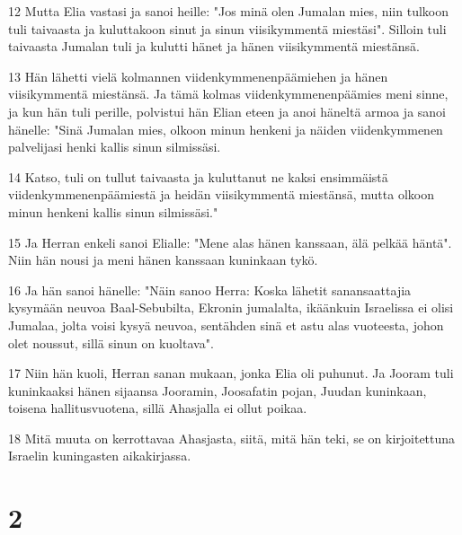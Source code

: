 \par 12 Mutta Elia vastasi ja sanoi heille: "Jos minä olen Jumalan mies, niin tulkoon tuli taivaasta ja kuluttakoon sinut ja sinun viisikymmentä miestäsi". Silloin tuli taivaasta Jumalan tuli ja kulutti hänet ja hänen viisikymmentä miestänsä.
\par 13 Hän lähetti vielä kolmannen viidenkymmenenpäämiehen ja hänen viisikymmentä miestänsä. Ja tämä kolmas viidenkymmenenpäämies meni sinne, ja kun hän tuli perille, polvistui hän Elian eteen ja anoi häneltä armoa ja sanoi hänelle: "Sinä Jumalan mies, olkoon minun henkeni ja näiden viidenkymmenen palvelijasi henki kallis sinun silmissäsi.
\par 14 Katso, tuli on tullut taivaasta ja kuluttanut ne kaksi ensimmäistä viidenkymmenenpäämiestä ja heidän viisikymmentä miestänsä, mutta olkoon minun henkeni kallis sinun silmissäsi."
\par 15 Ja Herran enkeli sanoi Elialle: "Mene alas hänen kanssaan, älä pelkää häntä". Niin hän nousi ja meni hänen kanssaan kuninkaan tykö.
\par 16 Ja hän sanoi hänelle: "Näin sanoo Herra: Koska lähetit sanansaattajia kysymään neuvoa Baal-Sebubilta, Ekronin jumalalta, ikäänkuin Israelissa ei olisi Jumalaa, jolta voisi kysyä neuvoa, sentähden sinä et astu alas vuoteesta, johon olet noussut, sillä sinun on kuoltava".
\par 17 Niin hän kuoli, Herran sanan mukaan, jonka Elia oli puhunut. Ja Jooram tuli kuninkaaksi hänen sijaansa Jooramin, Joosafatin pojan, Juudan kuninkaan, toisena hallitusvuotena, sillä Ahasjalla ei ollut poikaa.
\par 18 Mitä muuta on kerrottavaa Ahasjasta, siitä, mitä hän teki, se on kirjoitettuna Israelin kuningasten aikakirjassa.

\chapter{2}

